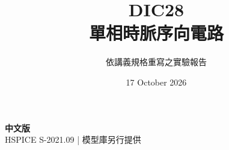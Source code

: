 \documentclass[11pt,a4paper]{article}
\title{\color{accent}DIC28\\[4pt]單相時脈序向電路}
\author{依講義規格重寫之實驗報告}
\date{17 October 2026}
\begin{document}
\maketitle
\begin{center}\small\textbf{中文版}\\
HSPICE S-2021.09 \quad | \quad 模型庫另行提供
\end{center}


\end{document}
